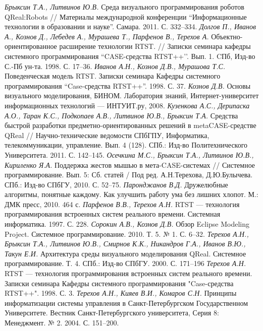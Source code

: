 \documentclass[a4, 12pt]{article}
\begin{document}
\begin{thebibliography}{9001}
 \emph{Брыксин Т.А., Литвинов Ю.В.} Среда визуального программирования роботов QReal:Robots // Материалы международной конференции ``Информационные технологии в образовании и науке''. Самара. 2011. С. 332--334.
 \emph{Долгов П., Иванов А., Кознов Д., Лебедев А., Мурашева Т., Парфенов В., Терехов А.} Объектно-ориентированное расширение технологии RTST. // Записки семинара кафедры системного программирования ``CASE-средства RTST++’’. Вып. 1. CПб, Изд-во С.-Пб ун-та. 1998. С. 17--36.
 \emph{Иванов А.Н., Кознов Д.В., Мурашова Т.С.} Поведенческая модель RTST. Записки семинара Кафедры системного программирования ``Case-средства RTST++''. 1998. С. 37.
 \emph{Кознов Д.В.} Основы визуального моделирования, БИНОМ. Лаборатория знаний, Интернет-университет информационных технологий --- ИНТУИТ.ру, 2008.
 \emph{Кузенкова А.С., Дерипаска А.О., Таран К.С., Подкопаев А.В., Литвинов Ю.В., Брыксин Т.А.} Средства быстрой разработки предметно-ориентированных решений в metaCASE-средстве QReal // Научно-технические ведомости СПбГПУ, Информатика, телекоммуникации, управление. Вып. 4 (128). СПб.: Изд-во Политехнического Университета. 2011. С. 142--145.
 \emph{Осечкина М.С., Брыксин Т.А., Литвинов Ю.В., Кириленко Я.А.} Поддержка жестов мышью в мета-CASE-системах // Системное программирование. Вып. 5: Сб. статей / Под ред. А.Н.Терехова, Д.Ю.Булычева.  СПб.: Изд-во СПбГУ, 2010. С. 52--75.
 \emph{Паронджанов В.Д.} Дружелюбные алгоритмы, понятные каждому. Как улучшить работу ума без лишних хлопот. М.: ДМК пресс, 2010. 464 с.
 \emph{Парфенов В.В., Терехов А.Н.} RTST --- технология программирования встроенных систем реального времени. Системная информатика. 1997. С. 228.
 \emph{Сорокин А.В., Кознов Д.В.} Обзор Eclipse Modeling Project. Системное программирование. 2010. Т. 5. № 1. С. 6--32. 
 \emph{Терехов А.Н., Брыксин Т.А., Литвинов Ю.В., Смирнов К.К., Никандров Г.А., Иванов В.Ю., Такун Е.И.} Архитектура среды визуального моделирования QReal. Системное программирование. Т. 4.  СПб.: Изд-во СПбГУ. 2000. С. 171--196
 \emph{Терехов А.Н.} RTST --- технология программирования встроенных систем реального времени. Записки семинара Кафедры системного программирования "Case-средства RTST++". 1998. С. 3.
 \emph{Терехов А.Н., Кияев В.И., Комаров С.Н.} Принципы информатизации системы управления в Санкт-Петербургском Государственном Университете. Вестник Санкт-Петербургского университета, Серия 8: Менеджмент. № 2. 2004. С. 151--200.

\end{thebibliography}
\end{document}

